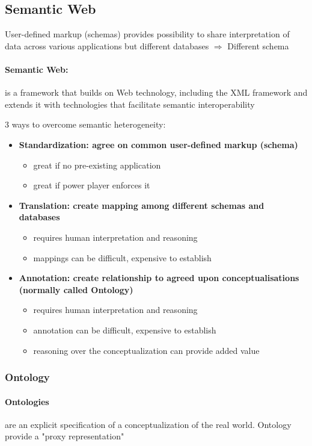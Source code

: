 \subsection{Semantic Web}
User-defined markup (schemas) provides possibility to share interpretation of data across various applications but different databases $\Rightarrow$ Different schema


\paragraph{Semantic Web:} is a framework that builds on Web technology, including the XML framework and extends it with technologies that facilitate semantic interoperability

3 ways to overcome semantic heterogeneity:

\begin{itemize}
\item \bf{Standardization:} agree on common user-defined markup (schema)
	\begin{itemize}
		\item great if no pre-existing application
		\item great if power player enforces it
	\end{itemize}
\item \bf{Translation:} create mapping among different schemas and databases
	\begin{itemize}
		\item requires human interpretation and reasoning
		\item mappings can be difficult, expensive to establish
	\end{itemize}
\item \bf{Annotation:} create relationship to agreed upon conceptualisations (normally called Ontology)
	\begin{itemize}
		\item requires human interpretation and reasoning
		\item annotation can be difficult, expensive to establish
		\item reasoning over the conceptualization can provide added value
	\end{itemize}
\end{itemize}

\subsubsection{Ontology}

\paragraph{Ontologies} are an explicit specification of a conceptualization of the real world. Ontology provide a "proxy representation"


